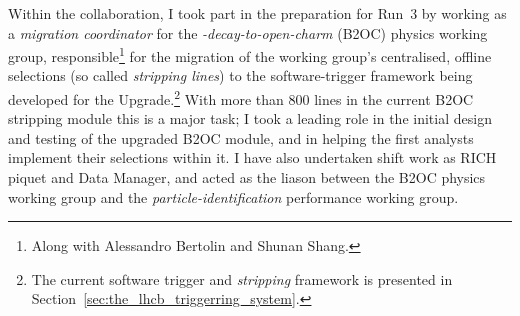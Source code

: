 Within the \lhcb collaboration, I took part in the preparation for Run~3 by working as a \emph{migration coordinator} for the \emph{\B-decay-to-open-charm} (B2OC) physics working group, responsible\footnote{Along with Alessandro Bertolin and Shunan Shang.} for the migration of the working group's centralised, offline selections (so called \emph{stripping lines}) to the software-trigger framework being developed for the \lhcb Upgrade.\footnote{The current software trigger and \emph{stripping} framework is presented in Section~\ref{sec:the_lhcb_triggerring_system}.} With more than 800 lines in the current B2OC stripping module this is a major task; I took a leading role in the initial design and testing of the upgraded B2OC module, and in helping the first analysts implement their selections within it. I have also undertaken shift work as RICH piquet and Data Manager, and acted as the liason between the B2OC physics working group and the \emph{particle-identification} performance working group.

